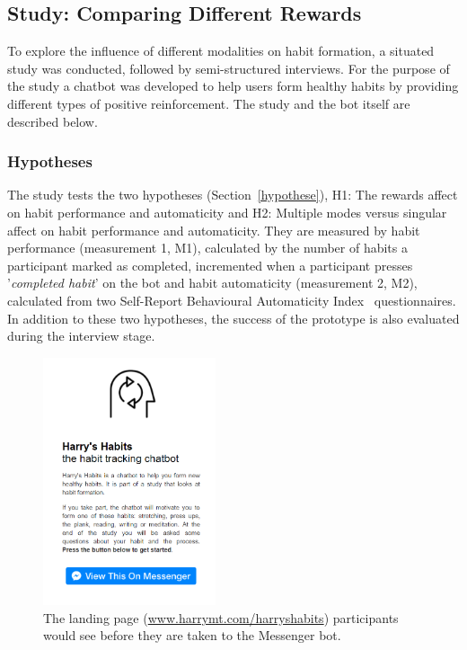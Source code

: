 \subsection{Study: Comparing Different Rewards} \label{study_comparing_rewards}
To explore the influence of different modalities on habit formation, a situated study was conducted, followed by semi-structured interviews. For the purpose of the study a chatbot was developed to help users form healthy habits by providing different types of positive reinforcement. The study and the bot itself are described below.


\subsubsection*{Hypotheses}
The study tests the two hypotheses (Section~\ref{hypothese}), H1: The rewards affect on habit performance and automaticity and H2: Multiple modes versus singular affect on habit performance and automaticity. They are measured by habit performance (measurement 1, M1), calculated by the number of habits a participant marked as completed, incremented when a participant presses '\textit{completed habit}' on the bot and habit automaticity  (measurement 2, M2), calculated from two Self-Report Behavioural Automaticity Index~\cite{article_4q_SRBAI} questionnaires. In addition to these two hypotheses, the success of the prototype is also evaluated during the interview stage.

\begin{figure}[H]
  \centering
  \includegraphics[width=2in]{resources/design/process/harryshabits-landing-page.png}
  \caption{The landing page (\url{www.harrymt.com/harryshabits}) participants would see before they are taken to the Messenger bot.}
  \label{fig:landing_page}
\end{figure}

